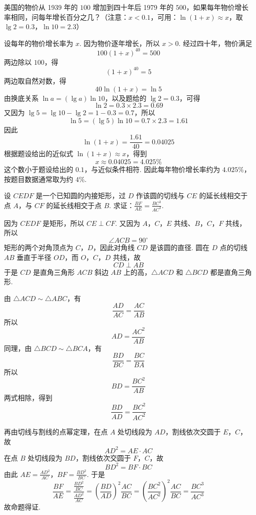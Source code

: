 \begin{problem}
美国的物价从 1939 年的 \(100\) 增加到四十年后 1979 年的 \(500\)，如果每年物价增长率相同，问每年增长百分之几？（注意：\(x < 0.1\)，可用：\(\ln\left(1+x\right) \approx x\)，取 \(\lg 2 = 0.3\)，\(\ln 10 = 2.3\)）
\end{problem}

\begin{solution}
设每年的物价增长率为 \(x\). 因为物价逐年增长，所以 \(x>0\). 经过四十年，物价满足
\[
100(1+x)^{40}=500
\]
两边除以 \(100\)，得
\[
\left(1+x\right)^{40}=5
\]
两边取自然对数，得
\[
40\ln\left(1+x\right)=\ln5
\]
由换底关系 \(\ln a=(\lg a)\ln10\)，以及题给的 \(\lg2=0.3\)，可得
\[
\ln2=0.3\times2.3=0.69
\]
又因为 \(\lg5=\lg10-\lg2=1-0.3=0.7\)，所以
\[
\ln5=(\lg5)\ln10=0.7\times2.3=1.61
\]
因此
\[
\ln\left(1+x\right)=\frac{1.61}{40}=0.04025
\]
根据题设给出的近似式 \(\ln(1+x)\approx x\)，得到
\[
x\approx0.04025=4.025\%
\]
这个数小于题设给出的 \(0.1\)，与近似条件相符. 因此每年物价增长率约为 \(4.025\%\)，按题目数据通常取为约 \(4\%\).
\end{solution}

\begin{problem}
设 \(CEDF\) 是一个已知圆的内接矩形，过 \(D\) 作该圆的切线与 \(CE\) 的延长线相交于点 \(A\)，与 \(CF\) 的延长线相交于点 \(B\). 求证：\(\frac{BF}{AE} = \frac{BC^{3}}{AC^{3}}\).

\FloatBarrier
\end{problem}

\begin{solution}
因为 \(CEDF\) 是矩形，所以 \(CE\perp CF\). 又因为 \(A\)，\(C\)，\(E\) 共线、\(B\)，\(C\)，\(F\) 共线，所以
\[
\angle ACB=90^{\circ}
\]
矩形的两个对角顶点为 \(C\)，\(D\)，因此对角线 \(CD\) 是该圆的直径. 圆在 \(D\) 点的切线 \(AB\) 垂直于半径 \(OD\)，而 \(O\)，\(C\)，\(D\) 共线，故
\[
CD\perp AB
\]
于是 \(CD\) 是直角三角形 \(ACB\) 斜边 \(AB\) 上的高，\(\triangle ACD\) 和 \(\triangle BCD\) 都是直角三角形.

由 \(\triangle ACD\sim\triangle ABC\)，有
\[
\frac{AD}{AC}=\frac{AC}{AB}
\]
所以
\[
AD=\frac{AC^2}{AB}
\]
同理，由 \(\triangle BCD\sim\triangle BCA\)，有
\[
\frac{BD}{BC}=\frac{BC}{BA}
\]
所以
\[
BD=\frac{BC^2}{AB}
\]
两式相除，得到
\[
\frac{BD}{AD}=\frac{BC^2}{AC^2}
\]

再由切线与割线的点幂定理，在点 \(A\) 处切线段为 \(AD\)，割线依次交圆于 \(E\)，\(C\)，故
\[
AD^2=AE\cdot AC
\]
在点 \(B\) 处切线段为 \(BD\)，割线依次交圆于 \(F\)，\(C\)，故
\[
BD^2=BF\cdot BC
\]
由此
\(AE=\frac{AD^2}{AC}\)，\(BF=\frac{BD^2}{BC}\).
于是
\[
\frac{BF}{AE}
=\frac{\frac{BD^2}{BC}}{\frac{AD^2}{AC}}
=\left(\frac{BD}{AD}\right)^2\frac{AC}{BC}
=\left(\frac{BC^2}{AC^2}\right)^2\frac{AC}{BC}
=\frac{BC^3}{AC^3}
\]
故命题得证.
\end{solution}


